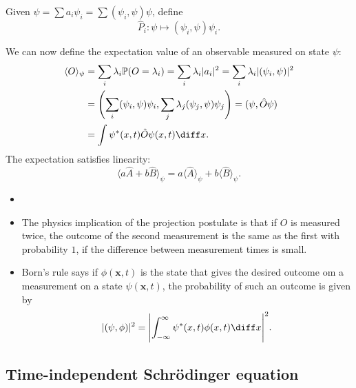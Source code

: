 \documentclass[12pt]{article}
\begin{document}
\begin{definition}
	Given $\psi = \sum a_i \psi_i = \sum (\psi_i, \psi) \psi$, define
	\[
		\hat P_i : \psi \mapsto (\psi_i, \psi) \psi_i
	.\]
\end{definition}

We can now define the expectation value of an observable measured on state $\psi$:
\begin{align*}
	\langle O \rangle_{\psi} &= \sum_{i} \lambda_i \mathbb{P}(O = \lambda_i) = \sum_{i} \lambda_i |a_i|^2 = \sum_{i} \lambda_i |(\psi_i, \psi)|^2 \\
				 &= \Biggl( \sum_{i}(\psi_i, \psi)\psi_i, \sum_{j} \lambda_j(\psi_j, \psi) \psi_j \Biggr) = (\psi, \hat O \psi) \\
				 &= \int \psi^{\ast}(x, t) \hat O \psi(x, t) \diff x.
\end{align*}
The expectation satisfies linearity:
\[
	\langle a \hat A + b \hat B \rangle_{\psi} = a \langle \hat A \rangle_{\psi} + b \langle \hat B \rangle_{\psi}
.\]

\begin{remark}
	\begin{itemize}
		\item[]
		\item The physics implication of the projection postulate is that if $O$ is measured twice, the outcome of the second measurement is the same as the first with probability $1$, if the difference between measurement times is small.
		\item Born's rule says if $\phi(\mathbf{x}, t)$ is the state that gives the desired outcome om a measurement on a state $\psi(\mathbf{x}, t)$, the probability of such an outcome is given by
			\[
				|(\psi, \phi)|^2 = \Biggl| \int_{-\infty}^{\infty} \psi^{\ast}(x, t) \phi(x, t) \diff x \Biggr|^2
			.\]
	\end{itemize}
\end{remark}

\subsection{Time-independent Schr\"{o}dinger equation}%
\label{sub:time_independent_schr"_o_dinger_equation}
\end{document}
